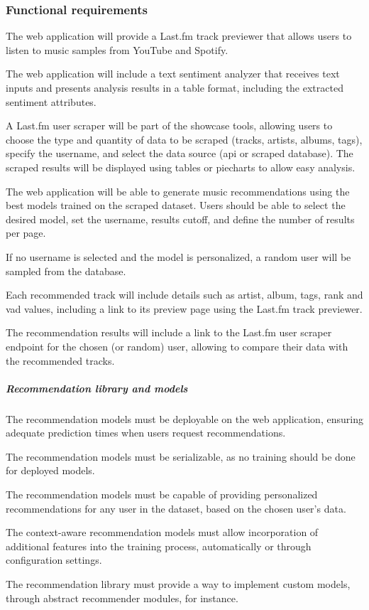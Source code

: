 \subsubsection{Functional requirements}
\begin{functionalmod}[WA]
    \item The web application will provide a Last.fm track previewer that allows users to listen to music samples from YouTube and Spotify.
    \item The web application will include a text sentiment analyzer that receives text inputs and presents analysis results in a table format, including the extracted sentiment attributes.
    \item A Last.fm user scraper will be part of the showcase tools, allowing users to choose the type and quantity of data to be scraped (tracks, artists, albums, tags), specify the username, and select the data source (\acs{api} or scraped database). The scraped results will be displayed using tables or piecharts to allow easy analysis.
    \item The web application will be able to generate music recommendations using the best models trained on the scraped dataset. Users should be able to select the desired model, set the username, results cutoff, and define the number of results per page.
    \begin{functionalmod}[WA]
        \item If no username is selected and the model is personalized, a random user will be sampled from the database.
        \item Each recommended track will include details such as artist, album, tags, rank and \acs{vad} values, including a link to its preview page using the Last.fm track previewer.
        \item The recommendation results will include a link to the Last.fm user scraper endpoint for the chosen (or random) user, allowing to compare their data with the recommended tracks.
    \end{functionalmod}
    \setcounter{WAF}{\value{enumi}}
\end{functionalmod}
\subparagraph{Recommendation library and models}
\begin{functionalmod}[WA]
    \setcounter{enumi}{\value{WAF}}
    \item The recommendation models must be deployable on the web application, ensuring adequate prediction times when users request recommendations.
    \item The recommendation models must be serializable, as no training should be done for deployed models.
    \item The recommendation models must be capable of providing personalized recommendations for any user in the dataset, based on the chosen user's data.
    \item The context-aware recommendation models must allow incorporation of additional features into the training process, automatically or through configuration settings.
    \item The recommendation library must provide a way to implement custom models, through abstract recommender modules, for instance.
\end{functionalmod}

